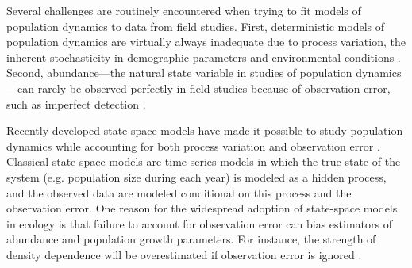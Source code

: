 \documentclass[12pt,english]{article}
\begin{document}
\begin{spacing}{1.9}
\begin{flushleft}
Several challenges are routinely encountered when trying to fit models
of population dynamics to data from field studies. %
First, deterministic models of population dynamics are virtually always inadequate due to process
variation, the inherent stochasticity in demographic parameters and environmental
conditions \citep{bjornstad_grenfell:2001,saether_engen:2002}.
Second, abundance---the natural state variable in studies
of population dynamics---can rarely be observed perfectly in field
studies because of observation error, such as imperfect
detection \citep{link_nichols:1994,kery_etal:2009}.

Recently developed state-space models %
have made it possible to %
study population dynamics while accounting for both process variation
and observation error \citep{devalpine_hastings:2002,
  buckland_etal:2004, dennis_etal:2006}. Classical state-space
models are time series models in which the true state of the
system (e.g. population size during each year) is modeled as a hidden
process, and the observed data are modeled conditional on this process
and the observation error. One reason for the widespread adoption of
state-space models in ecology is that failure to account for 
observation error can bias estimators of abundance and
population growth parameters. For instance, the strength of
density dependence will be overestimated if observation error is
ignored \citep{link_nichols:1994,shenk_etal:1998}.


\end{flushleft}
\end{spacing}
\end{document}
